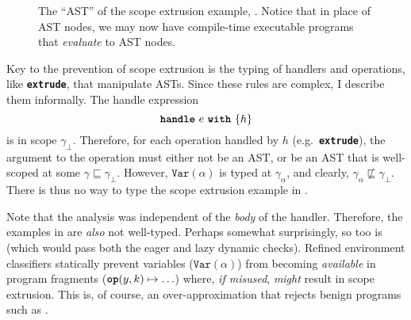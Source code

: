 \begin{figure}

\caption{The ``AST'' of the scope extrusion example, . Notice that in place of AST nodes, we may now have compile-time executable programs that \textit{evaluate} to AST nodes.}%
\label{fig:classifier-ast-scope-extrusion}
\end{figure}

Key to the prevention of scope extrusion is the typing of handlers and operations, like \textbf{\texttt{extrude}}, that manipulate ASTs. Since these rules are complex, I describe them informally. The handle expression
\[\textbf{\texttt{handle}} \,\, {e} \,\, \textbf{\texttt{with}} \,\, \{{h}\}\]
is in scope $\gamma_{\bot}$. Therefore, for each operation handled by $h$ (e.g.\ \textbf{\texttt{extrude}}), the argument to the operation must either not be an AST, or be an AST that is well-scoped at some $\gamma \sqsubseteq \gamma_{\bot}$. 
However, $\texttt{Var}(\alpha)$ is typed at $\gamma_{\alpha}$, and clearly, $\gamma_{\alpha} \not\sqsubseteq \gamma_{\bot}$. There is thus no way to type the scope extrusion example in .

Note that the analysis was independent of the \textit{body} of the handler. Therefore, the examples in  are \textit{also} not well-typed. Perhaps somewhat surprisingly, so too is  (which would pass both the eager and lazy dynamic checks). Refined environment classifiers statically prevent variables ($\texttt{Var}(\alpha)$) from becoming \textit{available} in program fragments ($\texttt{\textbf{op}}(y, k) \mapsto \ldots$) where, \textit{if misused}, \textit{might} result in scope extrusion. This is, of course, an over-approximation that rejects benign programs such as .

